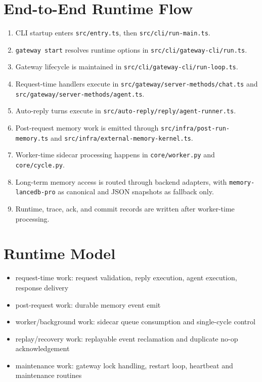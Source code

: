 \documentclass[11pt,a4paper,oneside,openany]{book}
\begin{document}
\section{End-to-End Runtime Flow}
\begin{enumerate}
  \item CLI startup enters \texttt{src/entry.ts}, then \texttt{src/cli/run-main.ts}.
  \item \texttt{gateway start} resolves runtime options in \texttt{src/cli/gateway-cli/run.ts}.
  \item Gateway lifecycle is maintained in \texttt{src/cli/gateway-cli/run-loop.ts}.
  \item Request-time handlers execute in \texttt{src/gateway/server-methods/chat.ts} and \texttt{src/gateway/server-methods/agent.ts}.
  \item Auto-reply turns execute in \texttt{src/auto-reply/reply/agent-runner.ts}.
  \item Post-request memory work is emitted through \texttt{src/infra/post-run-memory.ts} and \texttt{src/infra/external-memory-kernel.ts}.
  \item Worker-time sidecar processing happens in \texttt{core/worker.py} and \texttt{core/cycle.py}.
  \item Long-term memory access is routed through backend adapters, with \texttt{memory-lancedb-pro} as canonical and JSON snapshots as fallback only.
  \item Runtime, trace, ack, and commit records are written after worker-time processing.
\end{enumerate}
\section{Runtime Model}
\begin{itemize}
  \item request-time work: request validation, reply execution, agent execution, response delivery
  \item post-request work: durable memory event emit
  \item worker/background work: sidecar queue consumption and single-cycle control
  \item replay/recovery work: replayable event reclamation and duplicate no-op acknowledgement
  \item maintenance work: gateway lock handling, restart loop, heartbeat and maintenance routines
\end{itemize}
\end{document}
